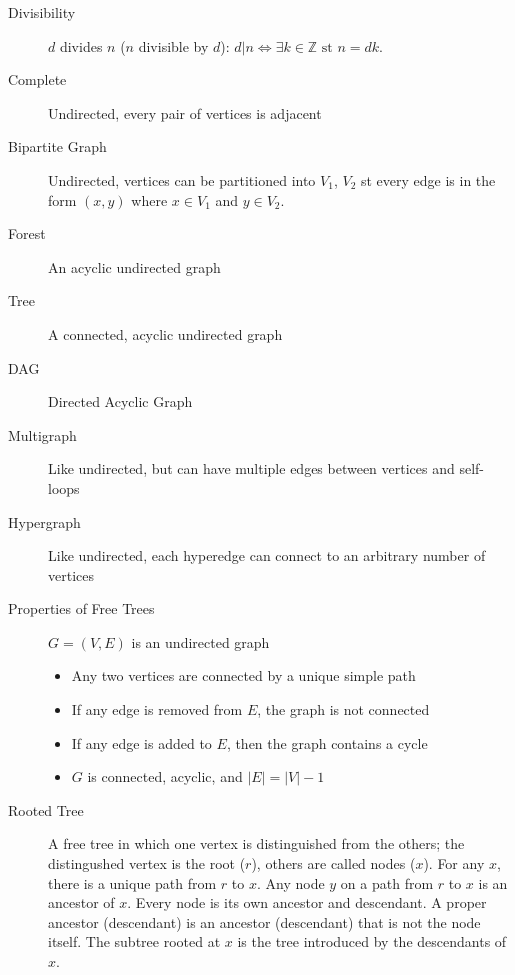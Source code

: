 \documentclass[8pt]{article}
\begin{document}
\begin{multicols}{2}
\begin{description}
  \item[Divisibility] $d$ divides $n$ ($n$ divisible by $d$): $d|n \Leftrightarrow
    \exists k \in \mathbb{Z}\text{ st } n = dk$.
  \item[Complete] Undirected, every pair of vertices is adjacent
  \item[Bipartite Graph] Undirected, vertices can be partitioned into
    $V_1$, $V_2$ st every edge is in the form $(x,y)$ where $x \in
    V_1$ and $y \in V_2$.
  \item[Forest] An acyclic undirected graph
  \item[Tree] A connected, acyclic undirected graph
  \item[DAG] Directed Acyclic Graph
  \item[Multigraph] Like undirected, but can have multiple edges
    between vertices and self-loops
  \item[Hypergraph] Like undirected, each hyperedge can connect to an
    arbitrary number of vertices
  \item[Properties of Free Trees] $G=(V,E)$ is an undirected graph
    \begin{itemize}
    \item Any two vertices are connected by a unique simple path
    \item If any edge is removed from $E$, the graph is not connected
    \item If any edge is added to $E$, then the graph contains a cycle
    \item $G$ is connected, acyclic, and $|E| = |V|-1$
    \end{itemize}
  \item[Rooted Tree] A free tree in which one vertex is distinguished
    from the others; the distingushed vertex is the root ($r$), others
    are called nodes ($x$). For any $x$, there is a unique path from
    $r$ to $x$. Any node $y$ on a path from $r$ to $x$ is an ancestor
    of $x$. Every node is its own ancestor and descendant. A proper
    ancestor (descendant) is an ancestor (descendant) that is not the
    node itself. The subtree rooted at $x$ is the tree introduced by
    the descendants of $x$.
  \end{description} %
\end{multicols}
\end{document}
